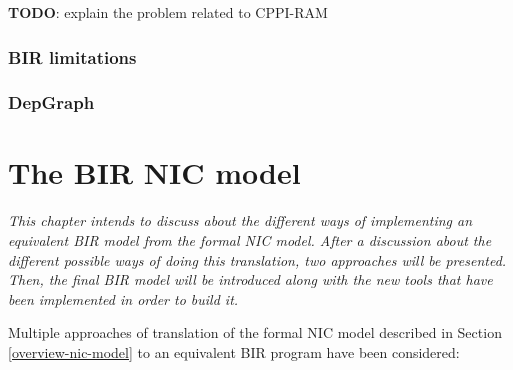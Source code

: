 \documentclass{kththesis}
\begin{document}
\textbf{TODO}: explain the problem related to CPPI-RAM



\subsection{BIR limitations}
\subsection{DepGraph}




\chapter{The BIR NIC model} \label{nic-model}
\vspace{-1cm}
\textit{This chapter intends to discuss about the different ways of implementing an equivalent BIR model from the formal NIC model. After a discussion about the different possible ways of doing this translation, two approaches will be presented. Then, the final BIR model will be introduced along with the new tools that have been implemented in order to build it.}

Multiple approaches of translation of the formal NIC model described in Section \ref{overview-nic-model} to an equivalent BIR program have been considered:
\end{document}
